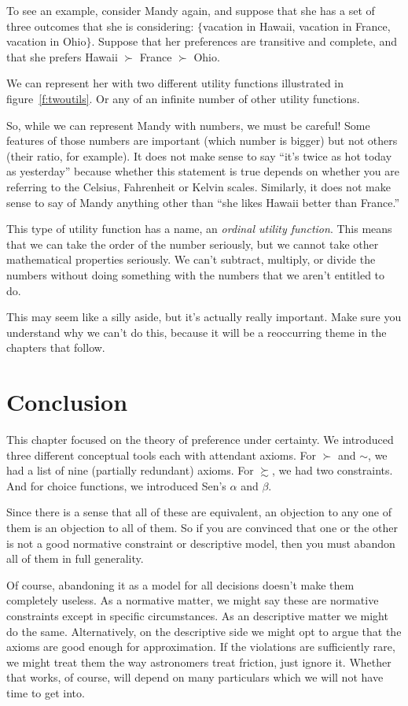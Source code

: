 To see an example, consider Mandy again, and suppose that she has a set of three outcomes that she is considering: $\{$vacation in Hawaii, vacation in France, vacation in Ohio$\}$.  Suppose that her preferences are transitive and complete, and that she prefers Hawaii $\succ$ France $\succ$ Ohio.  

We can represent her with two different utility functions illustrated in figure~\ref{f:twoutils}. Or any of an infinite number of other utility functions. 

So, while we can represent Mandy with numbers, we must be careful! Some features of those numbers are important (which number is bigger) but not others (their ratio, for example).  It does not make sense to say ``it's twice as hot today as yesterday'' because whether this statement is true depends on whether you are referring to the Celsius, Fahrenheit or Kelvin scales.  Similarly, it does not make sense to say of Mandy anything other than ``she likes Hawaii better than France.''

This type of utility function has a name, an {\it ordinal utility function}.  This means that we can take the order of the number seriously, but we cannot take other mathematical properties seriously.  We can't subtract, multiply, or divide the numbers without doing something with the numbers that we aren't entitled to do.

This may seem like a silly aside, but it's actually really important. Make sure you understand why we can't do this, because it will be a reoccurring theme in the chapters that follow.

\section{Conclusion}

This chapter focused on the theory of preference under certainty.  We introduced three different conceptual tools each with attendant axioms.  For $\succ$ and $\sim$, we had a list of nine (partially redundant) axioms.  For $\succsim$, we had two constraints. And for choice functions, we introduced Sen's $\alpha$ and $\beta$.

Since there is a sense that all of these are equivalent, an objection to any one of them is an objection to all of them.  So if you are convinced that one or the other is not a good normative constraint or descriptive model, then you must abandon all of them in full generality.

Of course, abandoning it as a model for all decisions doesn't make them completely useless.  As a normative matter, we might say these are normative constraints except in specific circumstances.  As an descriptive matter we might do the same. Alternatively, on the descriptive side we might opt to argue that the axioms are good enough for approximation.  If the violations are sufficiently rare, we might treat them the way astronomers treat friction, just ignore it.  Whether that works, of course, will depend on many particulars which we will not have time to get into.